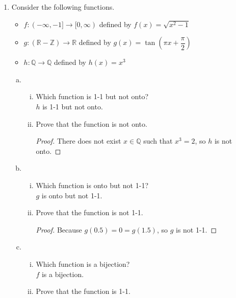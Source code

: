 \documentclass[12pt]{amsart}
\begin{document}
\begin{enumerate}[{\bfseries 1.}]
\newpage
\noindent
\item Consider the following functions.
	\begin{itemize}
	\vspace{0.2in}
	\item $f: (-\infty, -1]\to [0,\infty)$ defined by $f(x)=\sqrt{x^{2}-1}$
	\vspace{0.1in}
	\item $g: (\mathbb{R}-\mathbb{Z})\to\mathbb{R}$ defined by $g(x)=\tan{\left(\pi x+\dfrac{\pi}{2}\right)}$
	\vspace{0.1in}
	\item $h: \mathbb{Q}\to\mathbb{Q}$ defined by $h(x)=x^{3}$
	\end{itemize}

	\begin{enumerate}[(a)]
	\vspace{0.2in}
	\item\begin{enumerate}[(i)]
		\item Which function is 1-1 but not onto?
			\\$h$ is 1-1 but not onto.
		\vspace{0.1in}
		\item Prove that the function is not onto.
			\begin{proof}
			There does not exist $x\in\mathbb{Q}$ such that $x^3 = 2$, so $h$ is not onto.
			\end{proof}
		\end{enumerate}
	\vspace{0.1in}
	\item\begin{enumerate}[(i)]
		\item Which function is onto but not 1-1?
			\\$g$ is onto but not 1-1.
		\vspace{0.1in}
		\item Prove that the function is not 1-1.
			\begin{proof}
			Because $g(0.5) = 0 = g(1.5)$, so $g$ is not 1-1.
			\end{proof}
		\end{enumerate}
	\newpage
	\item\begin{enumerate}[(i)]
		\item Which function is a bijection?
			\\$f$ is a bijection.
		\vspace{0.1in}
		\item Prove that the function is 1-1.

\end{enumerate}
\end{enumerate}
\end{enumerate}
\end{document}
